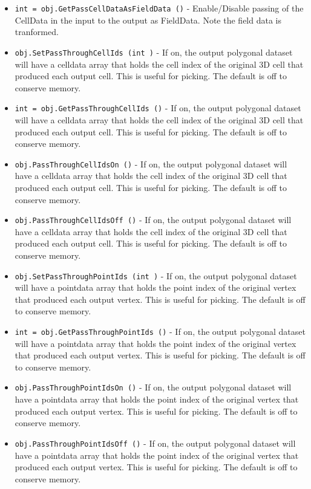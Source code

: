 \begin{itemize}
\item  \verb|int = obj.GetPassCellDataAsFieldData ()| -  Enable/Disable passing of the CellData in the input to
 the output as FieldData. Note the field data is tranformed.

\item  \verb|obj.SetPassThroughCellIds (int )| -  If on, the output polygonal dataset will have a celldata array that 
 holds the cell index of the original 3D cell that produced each output
 cell. This is useful for picking. The default is off to conserve 
 memory.

\item  \verb|int = obj.GetPassThroughCellIds ()| -  If on, the output polygonal dataset will have a celldata array that 
 holds the cell index of the original 3D cell that produced each output
 cell. This is useful for picking. The default is off to conserve 
 memory.

\item  \verb|obj.PassThroughCellIdsOn ()| -  If on, the output polygonal dataset will have a celldata array that 
 holds the cell index of the original 3D cell that produced each output
 cell. This is useful for picking. The default is off to conserve 
 memory.

\item  \verb|obj.PassThroughCellIdsOff ()| -  If on, the output polygonal dataset will have a celldata array that 
 holds the cell index of the original 3D cell that produced each output
 cell. This is useful for picking. The default is off to conserve 
 memory.

\item  \verb|obj.SetPassThroughPointIds (int )| -  If on, the output polygonal dataset will have a pointdata array that 
 holds the point index of the original vertex that produced each output
 vertex. This is useful for picking. The default is off to conserve 
 memory.

\item  \verb|int = obj.GetPassThroughPointIds ()| -  If on, the output polygonal dataset will have a pointdata array that 
 holds the point index of the original vertex that produced each output
 vertex. This is useful for picking. The default is off to conserve 
 memory.

\item  \verb|obj.PassThroughPointIdsOn ()| -  If on, the output polygonal dataset will have a pointdata array that 
 holds the point index of the original vertex that produced each output
 vertex. This is useful for picking. The default is off to conserve 
 memory.

\item  \verb|obj.PassThroughPointIdsOff ()| -  If on, the output polygonal dataset will have a pointdata array that 
 holds the point index of the original vertex that produced each output
 vertex. This is useful for picking. The default is off to conserve 
 memory.

\end{itemize}
